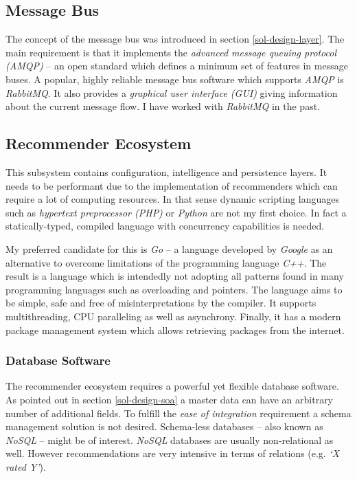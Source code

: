 \subsection{Message Bus}

The concept of the message bus was introduced in section \ref{sol-design-layer}. The main requirement is that it implements the \emph{advanced message queuing protocol (AMQP)} -- an open standard which defines a minimum set of features in message buses. A popular, highly reliable message bus software which supports \emph{AMQP} is \emph{RabbitMQ}. It also provides a \emph{graphical user interface (GUI)} giving information about the current message flow. I have worked with \emph{RabbitMQ} in the past.

\subsection{Recommender Ecosystem}

This subsystem contains configuration, intelligence and persistence layers. It needs to be performant due to the implementation of recommenders which can require a lot of computing resources. In that sense dynamic scripting languages such as \emph{hypertext preprocessor (PHP)} or \emph{Python} are not my first choice. In fact a statically-typed, compiled language with concurrency capabilities is needed.

My preferred candidate for this is \emph{Go} -- a language developed by \emph{Google} as an alternative to overcome limitations of the programming language \emph{C++}. The result is a language which is intendedly not adopting all patterns found in many programming languages such as overloading and pointers. The language aims to be simple, safe and free of misinterpretations by the compiler. It supports multithreading, CPU paralleling as well as asynchrony. Finally, it has a modern package management system which allows retrieving packages from the internet.

\subsubsection{Database Software}

The recommender ecosystem requires a powerful yet flexible database software. As pointed out in section \ref{sol-design-soa} a master data can have an arbitrary number of additional fields. To fulfill the \emph{ease of integration} requirement a schema management solution is not desired. Schema-less databases -- also known as \emph{NoSQL} -- might be of interest. \emph{NoSQL} databases are usually non-relational as well. However recommendations are very intensive in terms of relations (e.g. \emph{`X rated Y'}).

